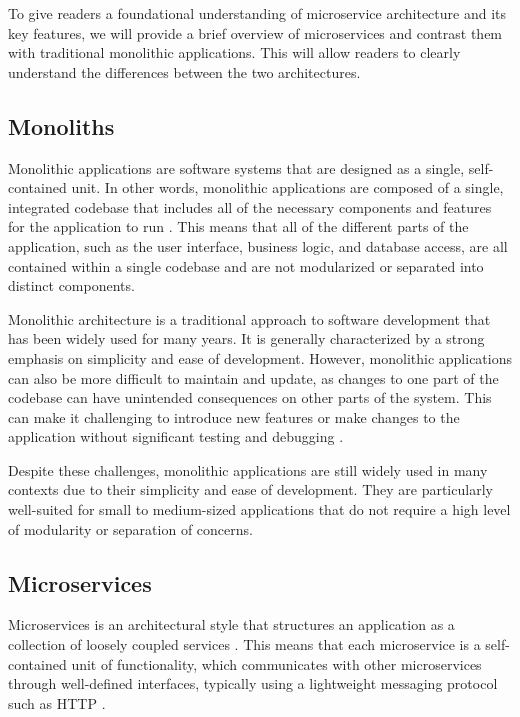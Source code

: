 \documentclass[conference]{IEEEtran}
\begin{document}
To give readers a foundational understanding of microservice architecture and
its key features, we will provide a brief overview of microservices and
contrast them with traditional monolithic applications. This will allow readers
to clearly understand the differences between the two architectures.

\subsection{Monoliths}

Monolithic applications are software systems that are designed as a single,
self-contained unit. In other words, monolithic applications are composed of a
single, integrated codebase that includes all of the necessary components and
features for the application to run \cite{kazanavivcius2019migrating}. This
means that all of the different parts of the application, such as the user
interface, business logic, and database access, are all contained within a
single codebase and are not modularized or separated into distinct components.

Monolithic architecture is a traditional approach to software development that
has been widely used for many years. It is generally characterized by a strong
emphasis on simplicity and ease of development. However, monolithic
applications can also be more difficult to maintain and update, as changes to
one part of the codebase can have unintended consequences on other parts of the
system. This can make it challenging to introduce new features or make changes
to the application without significant testing and debugging
\cite{kazanavivcius2019migrating}.

Despite these challenges, monolithic applications are still widely used in many
contexts due to their simplicity and ease of development. They are particularly
well-suited for small to medium-sized applications that do not require a high
level of modularity or separation of concerns.

\subsection{Microservices}

Microservices is an architectural style that structures an application as a
collection of loosely coupled services \cite{newman2021building}. This means
that each microservice is a self-contained unit of functionality, which
communicates with other microservices through well-defined interfaces,
typically using a lightweight messaging protocol such as HTTP
\cite{fowler-microservices}.
\end{document}
